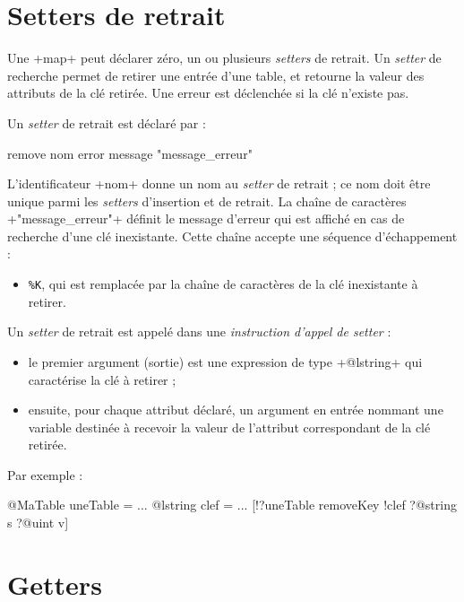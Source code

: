\section{Setters de retrait}

Une \ggs+map+ peut déclarer zéro, un ou plusieurs \emph{setters} de retrait. Un \emph{setter} de recherche permet de retirer une entrée d'une table, et retourne la valeur des attributs de la clé retirée. Une erreur est déclenchée si la clé n'existe pas.


Un \emph{setter} de retrait est déclaré par :

\begin{galgas}
remove nom error message "message_erreur"
\end{galgas}

L'identificateur \ggs+nom+ donne un nom au \emph{setter} de retrait ; ce nom doit être unique parmi les \emph{setters} d'insertion et de retrait. La chaîne de caractères \ggs+"message_erreur"+ définit le message d'erreur qui est affiché en cas de recherche d'une clé inexistante. Cette chaîne accepte une séquence d'échappement :
\begin{itemize}
  \item \texttt{\%K}, qui est remplacée par la chaîne de caractères de la clé inexistante à retirer.
\end{itemize}


Un \emph{setter} de retrait est appelé dans une \emph{instruction d'appel de setter} :
\begin{itemize}
  \item le premier argument (sortie) est une expression de type \ggs+@lstring+ qui caractérise la clé à retirer ;
  \item ensuite, pour chaque attribut déclaré, un argument en entrée nommant une variable destinée à recevoir la valeur de l'attribut correspondant de la clé retirée.
\end{itemize}

Par exemple :
\begin{galgas}
@MaTable uneTable = {}
...
@lstring clef = ...
[!?uneTable removeKey !clef ?@string s ?@uint v]
\end{galgas}

\section{Getters}

